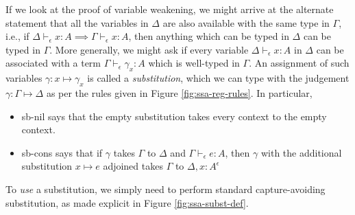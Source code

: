 \documentclass[acmsmall,screen,review]{acmart}
\newcommand{\thyp}[3]{#1 : {#2}^{#3}}
\newcommand{\hasty}[4]{#1 \vdash_{#2} #3: {#4}}
\newcommand{\issubst}[3]{#1: #2 \mapsto #3}
\newcommand{\brle}[1]{{\textsf{#1}}}
\begin{document}
If we look at the proof of variable weakening, we might arrive at the alternate statement that all
the variables in $\Delta$ are also available with the same type in $\Gamma$, i.e., if
$\hasty{\Delta}{\epsilon}{x}{A} \implies \hasty{\Gamma}{\epsilon}{x}{A}$, then anything which can be
typed in $\Delta$ can be typed in $\Gamma$. More generally, we might ask if every variable
$\hasty{\Delta}{\epsilon}{x}{A}$ in $\Delta$ can be associated with a term
$\hasty{\Gamma}{\epsilon}{\gamma_x}{A}$ which is well-typed in $\Gamma$. An assignment of such
variables $\gamma : x \mapsto \gamma_x$ is called a \emph{substitution}, which we can type with the
judgement $\issubst{\gamma}{\Gamma}{\Delta}$ as per the rules given in Figure
\ref{fig:ssa-reg-rules}. In particular,
\begin{itemize}
  \item \brle{sb-nil} says that the empty substitution takes every context to the empty context.
  \item \brle{sb-cons} says that if $\gamma$ takes $\Gamma$ to $\Delta$ and
  $\hasty{\Gamma}{\epsilon}{e}{A}$, then $\gamma$ with the additional substitution $x \mapsto e$
  adjoined takes $\Gamma$ to $\Delta, \thyp{x}{A}{\epsilon}$
\end{itemize}
To \emph{use} a substitution, we simply need to perform standard capture-avoiding substitution, as
made explicit in Figure \ref{fig:ssa-subst-def}.
\end{document}
